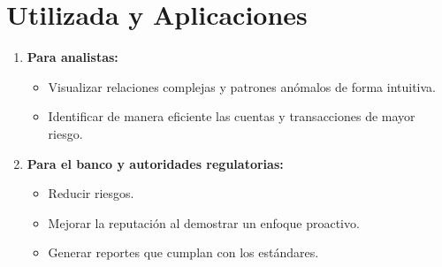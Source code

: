 \section{Utilizada y Aplicaciones}
\begin{enumerate}
    \item \textbf{Para analistas:} 
    \begin{itemize}
        \item Visualizar relaciones complejas y patrones anómalos de forma intuitiva.
        \item Identificar de manera eficiente las cuentas y transacciones de mayor riesgo.
    \end{itemize}
    \item \textbf{Para el banco y autoridades regulatorias:}
    \begin{itemize}
        \item Reducir riesgos.
        \item Mejorar la reputación al demostrar un enfoque proactivo.
        \item Generar reportes que cumplan con los estándares.
    \end{itemize}
\end{enumerate}


\pagebreak
\nocite{*}




